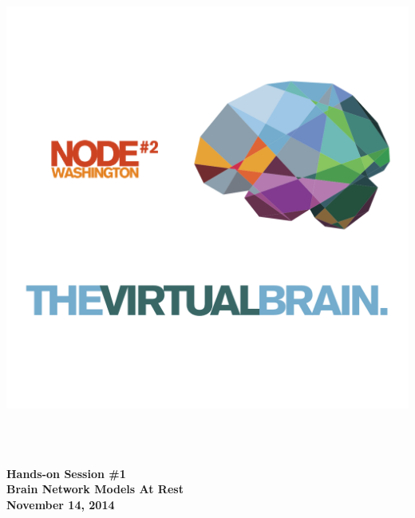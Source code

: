 \thispagestyle{plain}
\begin{titlepage}
\begin{center}
\includegraphics[width=1.5\textwidth]{./tvb_logo_transparent_square.png}~\\[0.5cm]

\begin{fullwidth}
\HRule \\[0.2cm]
\begin{center}
{ \huge \bfseries Hands-on Session \#1 \\ [0.2cm] Brain Network Models At Rest \\[0.1cm] }
{ \large \bfseries November 14, 2014 \\[0.2cm]}
\end{center}
\HRule \\[0.2cm]
\end{fullwidth}

\end{center}
\end{titlepage}